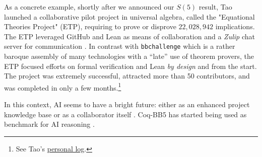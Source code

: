 \documentclass[a4paper,british]{article}
\theoremstyle{definition} %
\numberwithin{equation}{section}
\theoremstyle{definition} %
\newcommand{\CoqBB}{Coq-BB5\xspace}
\begin{document}
As a concrete example, shortly after we announced our $S(5)$ result, Tao launched a collaborative pilot project in universal algebra, called the "Equational Theories Project" (ETP), requiring to prove or disprove $22,028,942$ implications. The ETP leveraged GitHub and Lean as means of collaboration and a \textit{Zulip} chat server for communication \cite{TaoBlog, ETPGithub, ETPpaper}. In contrast with \texttt{bbchallenge} which is a rather baroque assembly of many technologies with a ``late'' use of theorem provers, the ETP focused efforts on formal verification and Lean \textit{by design} and from the start. The project was extremely successful, attracted more than 50 contributors, and was completed in only a few months.\footnote{See Tao's \href{https://github.com/teorth/equational_theories/wiki/Terence-Tao's-personal-log}{personal log}.}

In this context, AI seems to have a bright future: either as an enhanced project knowledge base or as a collaborator itself \cite{Trinh2024, wu2024internlm25stepproveradvancingautomatedtheorem}. \CoqBB has started being used as  benchmark for AI reasoning \cite{teodorescu2024nlir}.






\end{document}

